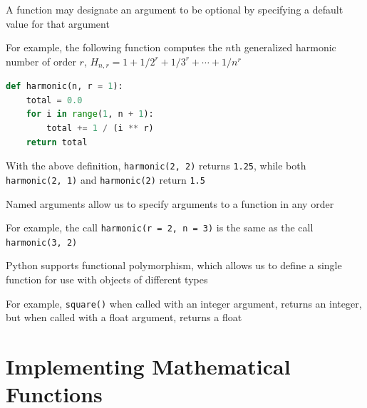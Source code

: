 \documentclass[8pt,a4paper,compress]{beamer}
\begin{document}
\begin{frame}[fragile]
\pause

A function may designate an argument to be optional by specifying a default value for that argument

\pause
\bigskip

For example, the following function computes the $n$th generalized harmonic number of order $r$, $H_{n,r}=1+1/2^r+1/3^r+\cdots+1/n^r$

\begin{lstlisting}[language=Python]
def harmonic(n, r = 1):
    total = 0.0
    for i in range(1, n + 1):
        total += 1 / (i ** r)
    return total
\end{lstlisting}
With the above definition, \lstinline{harmonic(2, 2)} returns \lstinline{1.25}, while both \lstinline{harmonic(2, 1)} and \lstinline{harmonic(2)} return \lstinline{1.5}

\pause
\bigskip

Named arguments allow us to specify arguments to a function in any order

\pause
\bigskip

For example, the call \lstinline{harmonic(r = 2, n = 3)} is the same as the call \lstinline{harmonic(3, 2)}

\pause
\bigskip

Python supports functional polymorphism, which allows us to define a single function for use with objects of different types

\pause
\bigskip

For example, \lstinline{square()} when called with an integer argument, returns an integer, but when called with a float argument, returns a float
\end{frame}

\section{Implementing Mathematical Functions}
\end{document}

